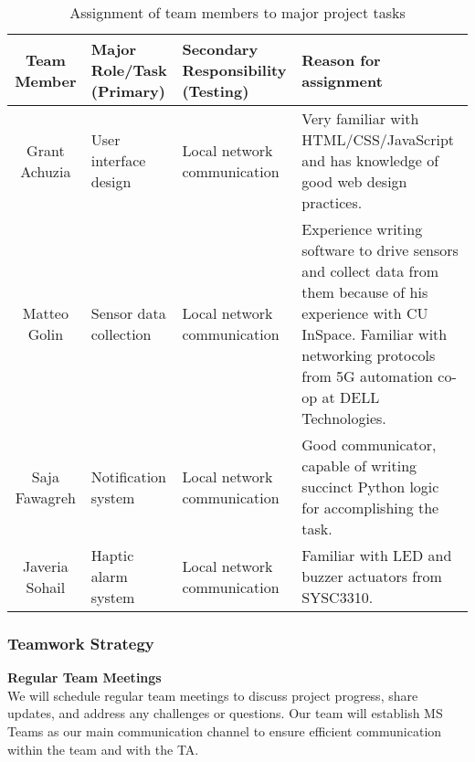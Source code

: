 \begin{table}[H]
    \centering
    \begin{tabular}{| c | p{3cm} | p{4cm} | p{5cm} |}
        \hline
        \textbf{Team Member} & \textbf{Major Role/Task (Primary)} & \textbf{Secondary Responsibility (Testing)} &
        \textbf{Reason for assignment}                                                                                                  \\
        \hline
        Grant Achuzia        & User interface design              & Local network communication                 & Very
        familiar with HTML/CSS/JavaScript and has knowledge of good web design practices.                                               \\
        \hline
        Matteo Golin         & Sensor data collection             & Local network communication                 &
        Experience writing software to drive sensors and collect data from them because of his experience with CU
        InSpace. Familiar with networking protocols from 5G automation co-op at DELL Technologies.                                      \\
        \hline
        Saja Fawagreh        & Notification system                & Local network communication                 &
        Good communicator, capable of writing succinct Python logic for accomplishing the task.                                         \\
        \hline
        Javeria Sohail       & Haptic alarm system                & Local network communication                 & Familiar with LED and
        buzzer actuators from SYSC3310.                                                                                                 \\
        \hline
    \end{tabular}
    \caption{Assignment of team members to major project tasks}
\end{table}

\subsubsection{Teamwork Strategy}

\textbf{Regular Team Meetings} \\
We will schedule regular team meetings to discuss project progress, share updates, and address any challenges or
questions. Our team will establish MS Teams as our main communication channel to ensure efficient communication within
the team and with the TA.

